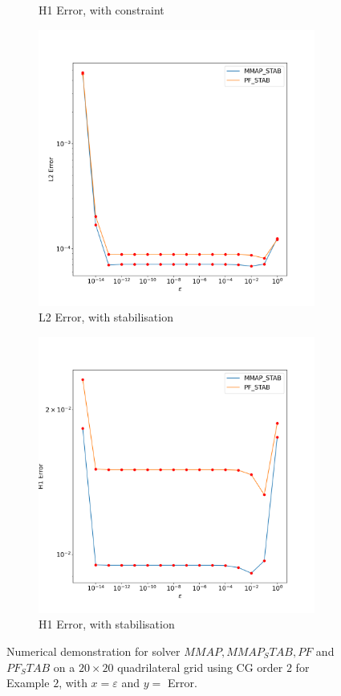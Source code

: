 \documentclass[12pt]{ociamthesis}
\begin{document}
\begin{figure}[H]
\begin{subfigure}{0.44\textwidth}
     \caption{H1 Error, with constraint}
 \end{subfigure}
 \begin{subfigure}{0.44\textwidth}
     \includegraphics[width=\textwidth]{Pics/LHSims/E2/E2_STABL2.png}
     \caption{L2 Error, with stabilisation}
 \end{subfigure}
 \hfill
 \begin{subfigure}{0.44\textwidth}
     \includegraphics[width=\textwidth]{Pics/LHSims/E2/E2_STABH1.png}
     \caption{H1 Error, with stabilisation}
 \end{subfigure}
 \caption{Numerical demonstration for solver $MMAP, MMAP_STAB, PF$ and $PF_STAB$ on a $20\times 20$ quadrilateral grid using CG order $2$ for Example $2$, with $x=\varepsilon$ and $y=$ Error.} \label{E2_LH}
\end{figure}
\end{document}
